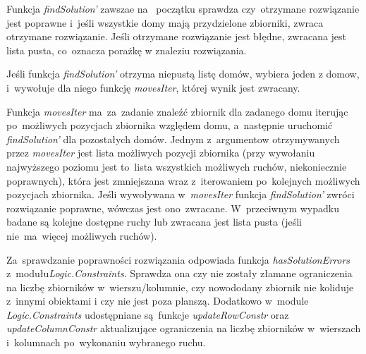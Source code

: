 \documentclass[11pt,a4paper]{article}
\begin{document}
Funkcja \textit{findSolution'} zawszae na~ początku sprawdza czy~otrzymane
rozwiązanie jest poprawne i~jeśli wszystkie domy mają przydzielone zbiorniki,
zwraca otrzymane rozwiązanie. Jeśli otrzymane rozwiązanie jest błędne, zwracana
jest lista pusta, co~oznacza porażkę w znaleziu rozwiązania.

Jeśli funkcja \textit{findSolution'} otrzyma niepustą listę domów, wybiera
jeden z domow, i~wywołuje dla niego funkcję \textit{movesIter}, której
wynik jest zwracany.

Funkcja \textit{movesIter} ma~za~zadanie znaleźć zbiornik dla zadanego domu
iterując po~możliwych pozycjach zbiornika względem domu,
a~następnie uruchomić \textit{findSolution'} dla pozostałych domów.
Jednym z~argumentow otrzymywanych przez \textit{movesIter} jest lista możliwych
pozycji zbiornika (przy wywołaniu najwyższego poziomu jest to~lista wszystkich
możliwych ruchów, niekoniecznie poprawnych), która jest zmniejszana wraz
z~iterowaniem po~kolejnych możliwych pozycjach zbiornika. Jeśli wywoływana
w~\textit{movesIter} funkcja \textit{findSolution'} zwróci rozwiązanie poprawne,
wówczas jest ono~zwracane. W~przeciwnym wypadku badane są kolejne dostępne
ruchy lub zwracana jest lista pusta (jeśli nie~ma~więcej możliwych ruchów).

Za~sprawdzanie poprawności rozwiązania odpowiada funkcja
\textit{hasSolutionErrors} z~modułu\newline \textit{Logic.Constraints}.
Sprawdza ona czy nie zostały złamane ograniczenia na liczbę zbiorników
w~wierszu/kolumnie, czy nowododany zbiornik nie koliduje z~innymi
obiektami i czy nie jest poza planszą. Dodatkowo w~module
\textit{Logic.Constraints} udostępniane są~funkcje \textit{updateRowConstr} oraz \textit{updateColumnConstr}
aktualizujące ograniczenia na liczbę zbiorników w~wierszach i~kolumnach
po~wykonaniu wybranego ruchu.
\end{document}
